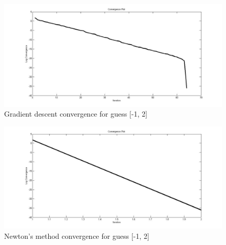 \documentclass[12pt]{article}
\begin{document}
\begin{figure}[H]
\begin{center}
\includegraphics[scale=0.375]{conv2g.jpg}
\caption{Gradient descent convergence for guess [-1, 2]}  
\end{center}
\end{figure}
\begin{figure}[H]
\begin{center}
\includegraphics[scale=0.375]{conv2n.jpg}
\caption{Newton's method convergence for guess [-1, 2]}  
\end{center}
\end{figure}
\end{document}
